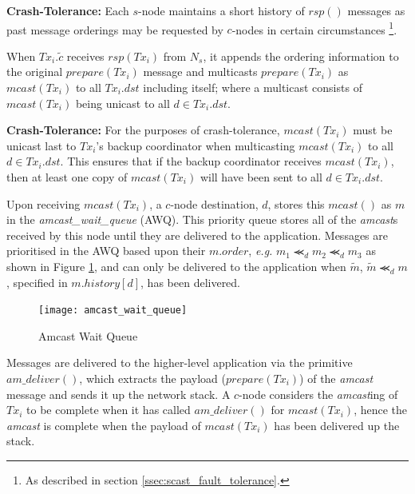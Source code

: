 \begin{enumerate}
        \textbf{Crash-Tolerance:} Each $s$-node maintains a short history of $rsp()$ messages as past message orderings may be requested by $c$-nodes in certain circumstances \footnote{As described in section \ref{ssec:scast_fault_tolerance}.}.          
        
        \leftbar
        When $Tx_i.\tilde{c}$ receives $rsp(Tx_i)$ from $N_s$, it appends the ordering information to the original $prepare(Tx_i)$ message and multicasts $prepare(Tx_i)$ as $mcast(Tx_i)$ to all $Tx_i.dst$ including itself; where a multicast consists of $mcast(Tx_i)$ being unicast to all $d \in Tx_i.dst$. 
        
        \textbf{Crash-Tolerance:} For the purposes of crash-tolerance, $mcast(Tx_i)$ must be unicast last to $Tx_i$'s backup coordinator when multicasting $mcast(Tx_i)$ to all $d \in Tx_i.dst$.  This ensures that if the backup coordinator receives $mcast(Tx_i)$, then at least one copy of $mcast(Tx_i)$ will have been sent to all $d \in Tx_i.dst$.  
        \endleftbar
        
        \leftbar
        Upon receiving $mcast(Tx_i)$, a $c$-node destination, $d$, stores this $mcast()$ as $m$ in the \emph{amcast\_wait\_queue} (AWQ).  This priority queue stores all of the \emph{amcast}s received by this node until they are delivered to the application.  Messages are prioritised in the AWQ based upon their $m.order$, \emph{e.g.} $m_1 \llcurly_d m_2 \llcurly_d m_3$ as shown in Figure \ref{fig:awq}, and can only be delivered to the application when $\tilde{m}$, $\tilde{m} \llcurly_d m$, specified in $m.history[d]$, has been delivered.  
        
         \begin{figure}[H] 
        \centering    
         \texttt{[image: amcast\_wait\_queue]}
         \caption[Amcast Wait Queue]{Amcast Wait Queue}
         \label{fig:awq}
    \end{figure}             
        \vspace{-2em}
        Messages are delivered to the higher-level application via the primitive $am\_deliver()$, which extracts the payload ($prepare(Tx_i)$) of the \emph{amcast} message and sends it up the network stack.  A $c$-node considers the \emph{amcast}ing of $Tx_i$ to be complete when it has called $am\_deliver()$ for $mcast(Tx_i)$, hence the \emph{amcast} is complete when the payload of $mcast(Tx_i)$ has been delivered up the stack.  
        

\end{enumerate}
